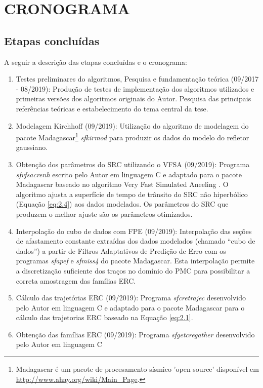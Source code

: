\chapter{CRONOGRAMA}
\label{cap9:cronograma}


\section{Etapas concluídas}

A seguir a descrição das etapas concluídas e o cronograma:

  \begin{enumerate}
   \item  Testes preliminares do algoritmos, Pesquisa e fundamentação teórica (09/2017 - 08/2019): Produção de testes 
   de implementação
   dos algoritmos utilizados e primeiras versões dos algoritmos originais do Autor.
   Pesquisa das principais referências teóricas e estabelecimento do tema central da tese.
   \item   Modelagem Kirchhoff (09/2019): Utilização do algoritmo de modelagem 
   do pacote Madagascar\footnote{Madagascar é um pacote
   de procesamento sísmico 'open source' disponível em \url{http://www.ahay.org/wiki/Main_Page}.}
   \textit{sfkirmod} para produzir os dados do modelo do refletor
   gaussiano.
    \item Obtenção dos parâmetros do SRC utilizando o VFSA (09/2019): Programa \textit{sfvfsacrenh} escrito  pelo Autor
    em linguagem C e adaptado para o pacote Madagascar
   baseado no algoritmo Very Fast Simulated Aneeling \cite{ingber}. O algoritmo ajusta a superfície de tempo de trânsito
   do SRC não hiperbólico (Equação \ref{eq:2.4}) aos dados modelados. Os parâmetros do SRC que produzem o melhor ajuste são
   os parâmetros otimizados.
    \item  Interpolação do cubo de dados com FPE (09/2019): Interpolação das seções de
    afastamento constante extraídas dos dados modelados
    (chamado ``cubo de dados'') a partir de Filtros Adaptativos de Predição de Erro
    com os programas \textit{sfapef} e \textit{sfmiss4} do pacote Madagascar.
    Esta interpolação permite a discretização
    suficiente dos traços no domínio do PMC para possibilitar a correta amostragem das famílias ERC.
    \item  Cálculo das trajetórias ERC (09/2019): Programa \textit{sfcretrajec} desenvolvido pelo Autor em linguagem C 
    e adaptado para o pacote Madagascar para
    o cálculo das trajetorias ERC baseado na Equação \ref{eq:2.1}.
     \item Obtenção das famílias ERC (09/2019): Programa \textit{sfgetcregather} desenvolvido pelo Autor em linguagem C 

\end{enumerate}
